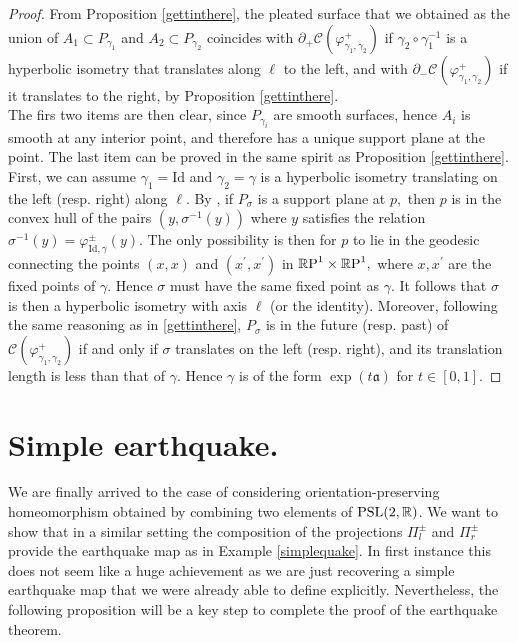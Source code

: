 \begin{proof}
    From Proposition \ref{gettinthere}, the pleated surface that we obtained as the union of $A_1\subset P_{\gamma_1}$ and $A_2\subset P_{\gamma_2}$ coincides with $\partial_+\mathcal{C}(\varphi_{\gamma_1,\gamma_2}^+)$ if $\gamma_2\circ\gamma_1^{-1}$ is a hyperbolic isometry that translates along $\ell$ to the left, and with $\partial_-\mathcal{C}(\varphi_{\gamma_1,\gamma_2}^+)$ if it translates to the right, by Proposition \ref{gettinthere}. \\
    The firs two items are then clear, since $P_{\gamma_i}$ are smooth surfaces, hence $A_i$ is smooth at any interior point, and therefore has a unique support plane at the point. The last item can be proved in the same spirit as Proposition \ref{gettinthere}. First, we can assume $\gamma_1=\text{Id}$ and $\gamma_2=\gamma$ is a hyperbolic isometry translating on the left (resp. right) along $\ell.$ By , if $P_\sigma$ is a support plane at $p,$ then $p$ is in the convex hull of the pairs $(y,\sigma^{-1}(y))$ where $y$ satisfies the relation $\sigma^{-1}(y)=\varphi_{\text{Id},\gamma}^{\pm}(y).$ The only possibility is then for $p$ to lie in the geodesic connecting the points $(x,x)$ and $(x^{\prime},x^{\prime})$ in $\mathbb{R}\text{P}^1\times\mathbb{R}\text{P}^1,$ where $x,x^{\prime}$ are the fixed points of $\gamma$. Hence $\sigma$ must have the same fixed point as $\gamma$. It follows that $\sigma$ is then a hyperbolic isometry with axis $\ell$ (or the identity). Moreover, following the same reasoning as in \ref{gettinthere}, $P_\sigma$ is in the future (resp. past) of $\mathcal{C}(\varphi_{\gamma_1,\gamma_2}^+)$ if and only if $\sigma$ translates on the left (resp. right), and its translation length is less than that of $\gamma.$ Hence $\gamma$ is of the form $\exp(t\mathfrak{a})$ for $t\in [0,1].$
\end{proof}

\section{Simple earthquake.}
We are finally arrived to the case of considering orientation-preserving homeomorphism obtained by combining two elements of $\text{PSL}(2,\mathbb{R})$. We want to show that in a similar setting the composition of the projections $\Pi_l^{\pm}$ and $\Pi_r^\pm$ provide the earthquake map as in Example \ref{simplequake}. In first instance this does not seem like a huge achievement as we are just recovering a simple earthquake map that we were already able to define explicitly. Nevertheless, the following proposition will be a key step to complete the proof of the earthquake theorem. 

